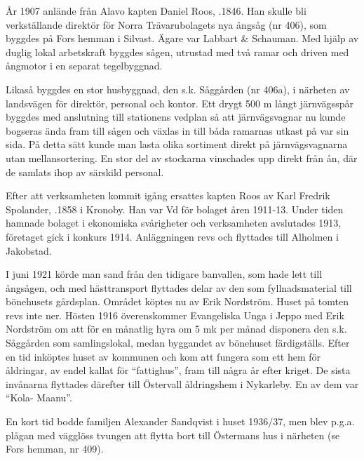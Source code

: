 

År 1907 anlände från Alavo kapten Daniel Roos, .1846. Han skulle bli verkställande direktör för Norra Trävarubolagets nya ångsåg (nr 406), som byggdes på Fors hemman i Silvast. Ägare var Labbart \& Schauman. Med hjälp av duglig lokal arbetskraft byggdes sågen, utrustad med två ramar och driven med ångmotor i en separat tegelbyggnad.

Likaså byggdes en stor husbyggnad, den s.k. Såggården (nr 406a), i närheten av landsvägen för direktör, personal och kontor. Ett drygt 500 m långt järnvägsspår byggdes med anslutning till stationens vedplan så att järnvägsvagnar nu kunde bogseras ända fram till sågen och växlas in till båda ramarnas utkast på var sin sida. På detta sätt kunde man lasta olika sortiment direkt på järnvägsvagnarna utan mellansortering. En stor del av stockarna vinschades upp direkt från ån, där de samlats ihop av särskild personal.



Efter att verksamheten kommit igång ersattes kapten Roos av Karl Fredrik Spolander, .1858 i Kronoby. Han var Vd för bolaget åren 1911-13. Under tiden hamnade bolaget i ekonomiska svårigheter och verksamheten avslutades 1913, företaget gick i konkurs 1914. Anläggningen revs och flyttades till Alholmen i Jakobstad.

I juni 1921 körde man sand från den tidigare banvallen, som hade lett till ångsågen, och med hästtransport flyttades delar av den som fyllnadsmaterial till bönehusets gårdsplan. Området köptes nu av Erik Nordström. Huset på tomten revs inte ner. Hösten 1916 överenskommer Evangeliska Unga i Jeppo med Erik Nordström  om att för en månatlig hyra om 5 mk per månad disponera den s.k. Såggården som samlingslokal, medan byggandet av bönehuset färdigställs. Efter en tid inköptes huset av kommunen och kom att fungera som ett hem för åldringar, av endel kallat för ``fattighus'', fram till några år efter kriget. De sista invånarna flyttades därefter till Östervall åldringshem i Nykarleby. En av dem var ``Kola- Maanu''.

En kort tid bodde familjen Alexander Sandqvist i huset 1936/37, men blev p.g.a. plågan med vägglöss tvungen att flytta bort till Östermans hus i närheten (se Fors hemman, nr 409).


